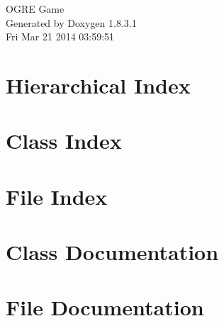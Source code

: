 \documentclass{book}
\begin{document}
\hypersetup{pageanchor=false,citecolor=blue}
\begin{titlepage}
\vspace*{7cm}
\begin{center}
{\Large O\-G\-R\-E Game }\\
\vspace*{1cm}
{\large Generated by Doxygen 1.8.3.1}\\
\vspace*{0.5cm}
{\small Fri Mar 21 2014 03:59:51}\\
\end{center}
\end{titlepage}
\clearemptydoublepage
{}
\tableofcontents
\clearemptydoublepage
{}
\hypersetup{pageanchor=true,citecolor=blue}
\chapter{Hierarchical Index}

\chapter{Class Index}

\chapter{File Index}

\chapter{Class Documentation}













\chapter{File Documentation}






















\printindex
\end{document}
